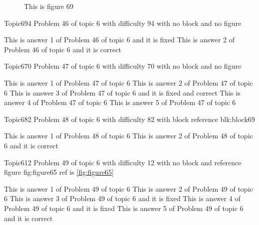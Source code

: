 \documentclass[master]{exam}
\begin{document}
\begin{figure}
	\begin{center}
		This is figure 69 
		\label{fig:figure69}
	\end{center}
\end{figure}

\begin{problem}{Topic6}{94}
	Problem 46 of topic 6 with difficulty 94 with no block and no figure
	\begin{answers}
		\answer[fixed] This is answer 1 of Problem 46 of topic 6 and it is fixed
		\answer[correct] This is answer 2 of Problem 46 of topic 6 and it is correct
	\end{answers}
\end{problem}

\begin{problem}{Topic6}{70}
	Problem 47 of topic 6 with difficulty 70 with no block and no figure
	\begin{answers}
		\answer This is answer 1 of Problem 47 of topic 6 
		\answer This is answer 2 of Problem 47 of topic 6 
		 This is answer 3 of Problem 47 of topic 6 and it is fixed and correct
		\answer This is answer 4 of Problem 47 of topic 6 
		\answer This is answer 5 of Problem 47 of topic 6 
	\end{answers}
\end{problem}

\begin{problem}[requires=blk:block69]{Topic6}{82}
	Problem 48 of topic 6 with difficulty 82 with block reference blk:block69
	\begin{answers}
		\answer This is answer 1 of Problem 48 of topic 6 
		\answer[correct] This is answer 2 of Problem 48 of topic 6 and it is correct
	\end{answers}
\end{problem}

\begin{problem}{Topic6}{12}
	Problem 49 of topic 6 with difficulty 12 with no block and reference figure fig:figure65 ref is \ref{fig:figure65}
	\begin{answers}
		\answer This is answer 1 of Problem 49 of topic 6 
		\answer This is answer 2 of Problem 49 of topic 6 
		\answer[fixed] This is answer 3 of Problem 49 of topic 6 and it is fixed
		\answer[fixed] This is answer 4 of Problem 49 of topic 6 and it is fixed
		\answer[correct] This is answer 5 of Problem 49 of topic 6 and it is correct
	\end{answers}
\end{problem}
\end{document}

